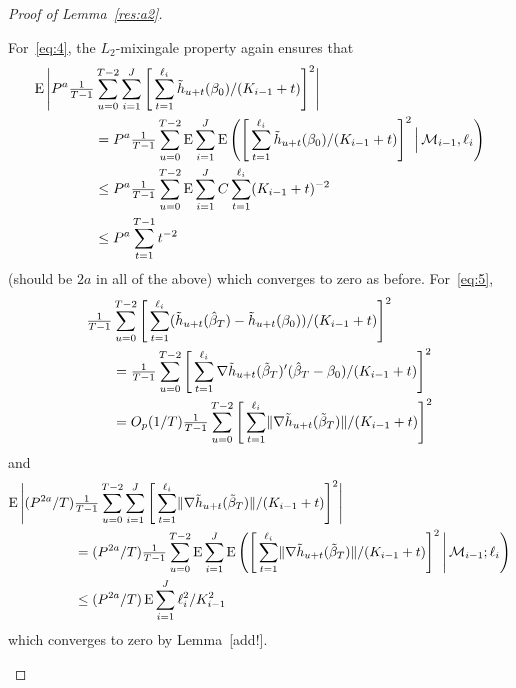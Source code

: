 \documentclass[12pt,fleqn]{article}
\begin{document}
\begin{proof}[Proof of Lemma~\ref{res:a2}]
\begin{enumerate}
    For~\eqref{eq:4}, the $L_2$-mixingale property again ensures that
    \begin{align*}
      \E\Bigg|P^a \tfrac{1}{T-1} &\sum_{u = 0}^{T-2} \sum_{i=1}^J \Bigg[\sum_{t = 1}^{\ell_{i}}
      \tilde{h}_{u + t}(\btrue)/ (K_{i-1} + t)\Bigg]^2 \Bigg| \\
      &= P^a \tfrac{1}{T-1} \sum_{u = 0}^{T-2} \E \sum_{i=1}^J \E\Bigg(\Bigg[\sum_{t = 1}^{\ell_{i}}
      \tilde{h}_{u + t}(\btrue)/ (K_{i-1} + t)\Bigg]^2 \,\Big|\, \Ms_{i-1}, \ell_i\Bigg) \\
      &\leq P^a \tfrac{1}{T-1} \sum_{u = 0}^{T-2} \E \sum_{i=1}^J C \sum_{t = 1}^{\ell_{i}} (K_{i-1} + t)^{-2} \\
      &\leq P^a \sum_{t=1}^{T-1} t^{-2}
    \end{align*}
    (should be $2a$ in all of the above)
    which converges to zero as before. For~\eqref{eq:5},
    \begin{align*}
      \tfrac{1}{T-1} &\sum_{u = 0}^{T-2} \Bigg[\sum_{t = 1}^{\ell_{i}}
      (\tilde{h}_{u + t}(\btrue[*]) - \tilde{h}_{u + t}(\btrue))/ (K_{i-1} + t)\Bigg]^2 \\
      &= \tfrac{1}{T-1} \sum_{u = 0}^{T-2} \Bigg[\sum_{t = 1}^{\ell_{i}}
      \nabla \tilde{h}_{u + t}(\tilde \beta_T)'(\btrue[*] - \btrue)/ (K_{i-1} + t)\Bigg]^2 \\
      &= O_p(1/T) \tfrac{1}{T-1} \sum_{u = 0}^{T-2} \Bigg[\sum_{t = 1}^{\ell_{i}}
      \lVert \nabla \tilde{h}_{u + t}(\tilde \beta_T) \rVert / (K_{i-1} + t)\Bigg]^2
    \end{align*}
    and
    \begin{align*}
      \operatorname{E} \Bigg| (P^{2a}/T) &\tfrac{1}{T-1} \sum_{u = 0}^{T-2} \sum_{i=1}^J \Bigg[\sum_{t =
        1}^{\ell_{i}} \lVert \nabla \tilde{h}_{u + t}(\tilde \beta_T)
      \rVert / (K_{i-1} + t)\Bigg]^2 \Bigg| \\
      &= (P^{2a}/T) \tfrac{1}{T-1} \sum_{u = 0}^{T-2} \operatorname{E} \sum_{i=1}^J
      \operatorname{E} \Bigg(\Bigg[\sum_{t =
        1}^{\ell_{i}} \lVert \nabla \tilde{h}_{u + t}(\tilde \beta_T)
      \rVert / (K_{i-1} + t)\Bigg]^2 \,\Bigg|\, \mathcal{M}_{i-1}; \ell_i \Bigg) \\
      &\leq (P^{2a}/T) \operatorname{E} \sum_{i=1}^J \ell_i^2/K_{i-1}^2
    \end{align*}
    which converges to zero by Lemma~[add!].


\end{enumerate}
\end{proof}
\end{document}
